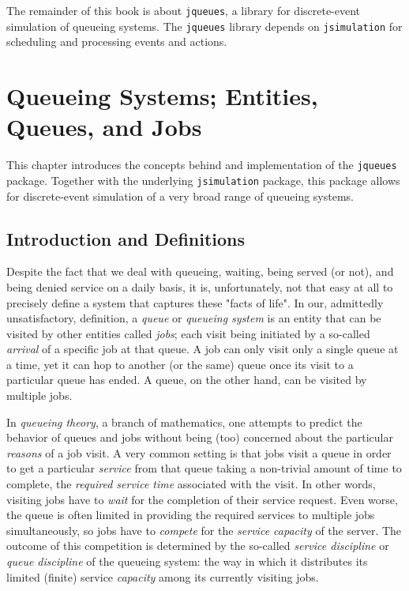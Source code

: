 \documentclass[12pt]{book}
\begin{document}
The remainder of this book is about \lstinline|jqueues|,
  a library for discrete-event simulation of queueing systems.
The \lstinline|jqueues| library depends on \lstinline|jsimulation|
  for scheduling and processing events and actions.

\chapter{Queueing Systems; Entities, Queues, and Jobs}
\label{chap:entities-queues-jobs}

This chapter introduces the concepts behind and implementation of the
  \lstinline|jqueues| package.
Together with the underlying \lstinline|jsimulation| package,
  this package allows for discrete-event simulation of
  a very broad range of queueing systems.

\section{Introduction and Definitions}

Despite the fact that we deal with queueing, waiting, being served (or not),
  and being denied service on a daily basis,
  it is,
  unfortunately,
  not that easy at all to precisely define a system
  that captures these "facts of life".
In our, admittedly unsatisfactory, definition,
  a {\em queue\/} or {\em queueing system\/} is an entity
  that can be visited
  by other entities called {\em jobs};
  each visit being initiated by a so-called {\em arrival\/} of a specific job
  at that queue.
A job can only visit only a single queue at a time,
  yet it can hop to another (or the same) queue
  once its visit to a particular queue has ended.
A queue, on the other hand,
  can be visited by multiple jobs.

In {\em queueing theory},
  a branch of mathematics,
  one attempts to predict the behavior of queues and jobs
  without being (too) concerned about the particular {\em reasons\/} of a job visit.
A very common setting is that jobs visit a queue in order to
  get a particular {\em service\/}
  from that queue
  taking a non-trivial amount of time to complete,
  the {\em required service time\/}
  associated with the visit.
In other words,
  visiting jobs have to {\em wait\/} for the completion of their service request.
Even worse,
  the queue is often limited in providing the required services
  to multiple jobs simultaneously,
  so jobs have to {\em compete\/}
  for the {\em service capacity} of the server.
The outcome of this competition is determined by the so-called
  {\em service discipline\/} or {\em queue discipline\/}
  of the queueing system:
  the way in which it distributes its limited (finite)
  service {\em capacity\/} among its currently visiting jobs.
\end{document}
